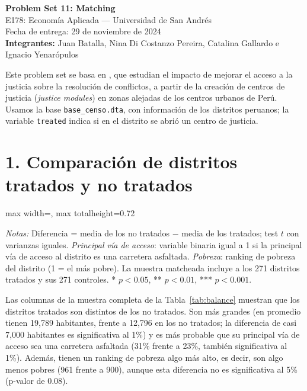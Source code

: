 \documentclass[11pt,a4paper]{article}
\newcommand{\tabla}[1]{\begin{adjustbox}{max width=\linewidth, max totalheight=0.72\textheight}\end{adjustbox}}
\newcommand{\notas}[1]{\par\vspace{0.3em}\begin{minipage}{0.92\linewidth}\footnotesize\textit{Notas:} #1\end{minipage}}
\begin{document}
\begin{center}
{\Large\bfseries Problem Set 11: Matching}\\[0.5em]
E178: Economía Aplicada --- Universidad de San Andrés\\
Fecha de entrega: 29 de noviembre de 2024\\[0.5em]
\textbf{Integrantes:} Juan Batalla, Nina Di Costanzo Pereira, Catalina Gallardo e Ignacio Yenarópulos
\end{center}

Este problem set se basa en \citet{soares}, que estudian el impacto de mejorar el acceso a la justicia sobre la resolución de conflictos, a partir de la creación de centros de justicia (\textit{justice modules}) en zonas alejadas de los centros urbanos de Perú. Usamos la base \texttt{base\_censo.dta}, con información de los distritos peruanos; la variable \texttt{treated} indica si en el distrito se abrió un centro de justicia.

\section*{1. Comparación de distritos tratados y no tratados}

\begin{table}[H]\centering
\caption{Tests de diferencia de medias antes y después del matching}\label{tab:balance}
\tabla{"../output/Tabla 1.tex"}
\notas{Diferencia = media de los no tratados $-$ media de los tratados; test $t$ con varianzas iguales. \textit{Principal vía de acceso}: variable binaria igual a 1 si la principal vía de acceso al distrito es una carretera asfaltada. \textit{Pobreza}: ranking de pobreza del distrito (1 = el más pobre). La muestra matcheada incluye a los 271 distritos tratados y sus 271 controles. * $p<0.05$, ** $p<0.01$, *** $p<0.001$.}
\end{table}

Las columnas de la muestra completa de la Tabla~\ref{tab:balance} muestran que los distritos tratados son distintos de los no tratados. Son más grandes (en promedio tienen 19,789 habitantes, frente a 12,796 en los no tratados; la diferencia de casi 7,000 habitantes es significativa al 1\%) y es más probable que su principal vía de acceso sea una carretera asfaltada (31\% frente a 23\%, también significativa al 1\%). Además, tienen un ranking de pobreza algo más alto, es decir, son algo menos pobres (961 frente a 900), aunque esta diferencia no es significativa al 5\% (p-valor de 0.08).
\end{document}
